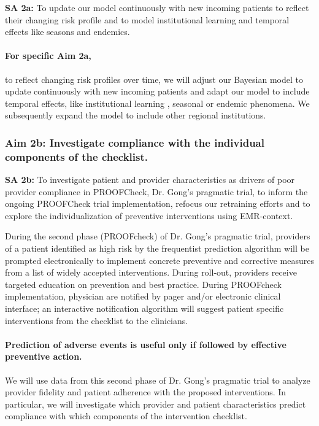 \documentclass[11pt,notitlepage]{article}
\begin{document}
\textbf{SA 2a:} To update our model continuously with new incoming patients to reflect their changing risk profile and to model institutional learning and temporal effects like seasons and endemics. 

\paragraph*{For specific Aim 2a,} to reflect changing risk profiles over time, we will adjust our Bayesian model to update continuously with new incoming patients and adapt our model to include temporal effects, like institutional learning , seasonal or endemic phenomena. We subsequently expand the model to include other regional institutions.

\subsubsection*{Aim 2b: Investigate compliance with the individual components of the checklist.}

\newline \textbf{SA 2b:} To investigate patient and provider characteristics as drivers of poor provider compliance in PROOFCheck, Dr. Gong's pragmatic trial, to inform the ongoing PROOFCheck trial implementation, refocus our retraining efforts and to explore the individualization of preventive interventions using EMR-context. 

During the second phase (PROOFcheck) of Dr. Gong's pragmatic trial, providers of a patient identified as high risk by the frequentist prediction algorithm will be prompted electronically to implement concrete preventive and corrective measures from a list of widely accepted interventions. During roll-out, providers receive targeted education on prevention and best practice. During PROOFcheck implementation, physician are notified by pager and/or electronic clinical interface; an interactive notification algorithm will suggest patient specific interventions from the checklist to the clinicians.  

\paragraph*{Prediction of adverse events is useful only if followed by effective preventive action. } We will use data from this second phase of Dr. Gong's pragmatic trial to analyze provider fidelity and patient adherence with the proposed interventions. In particular, we will investigate which provider and patient characteristics predict compliance with which components of the intervention checklist. 
\end{document}
